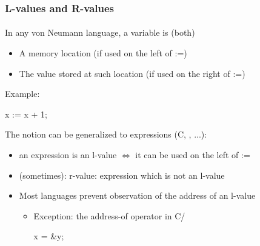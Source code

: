 \documentclass{beamer}
\begin{document}
\begin{frame}[fragile]
\frametitle{L-values and R-values}
\framesubtitle{}
In any von Neumann language, a variable is (both)
\begin{itemize} 
    \item A memory location                 (if used on the left of :=)
    \item The value stored at such location  (if used on the right of :=)
\end{itemize}

Example:
\begin{cplus3}
     x := x + 1;
\end{cplus3}

The notion can be generalized to expressions (C, \cpp, ...):
\begin{itemize}
\item an expression is an l-value $\Leftrightarrow$ it can be used on the left of :=
\item (sometimes): r-value: expression which is not an l-value
%
\item Most languages prevent observation of the address of an l-value
\begin{itemize}
\item Exception: the address-of operator in C/\cpp
\begin{cplus3}
  x = &y;
\end{cplus3}
\end{itemize}
\end{itemize}


\end{frame}
\end{document}
